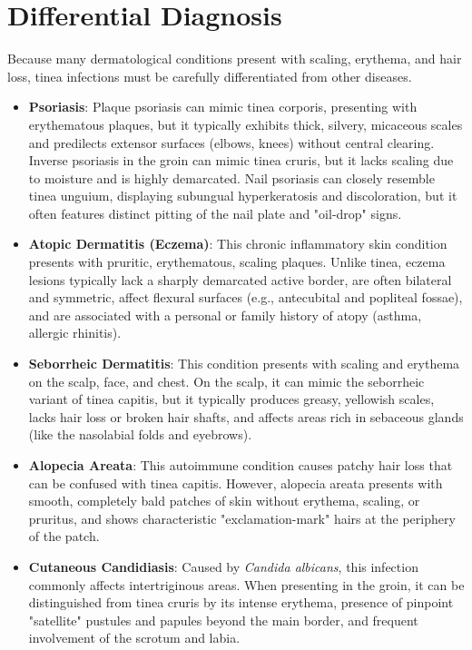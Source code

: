 \section*{Differential Diagnosis}
Because many dermatological conditions present with scaling, erythema, and hair loss, tinea infections must be carefully differentiated from other diseases.
\begin{itemize}
    \item \textbf{Psoriasis}: Plaque psoriasis can mimic tinea corporis, presenting with erythematous plaques, but it typically exhibits thick, silvery, micaceous scales and predilects extensor surfaces (elbows, knees) without central clearing. Inverse psoriasis in the groin can mimic tinea cruris, but it lacks scaling due to moisture and is highly demarcated. Nail psoriasis can closely resemble tinea unguium, displaying subungual hyperkeratosis and discoloration, but it often features distinct pitting of the nail plate and "oil-drop" signs.
    \item \textbf{Atopic Dermatitis (Eczema)}: This chronic inflammatory skin condition presents with pruritic, erythematous, scaling plaques. Unlike tinea, eczema lesions typically lack a sharply demarcated active border, are often bilateral and symmetric, affect flexural surfaces (e.g., antecubital and popliteal fossae), and are associated with a personal or family history of atopy (asthma, allergic rhinitis).
    \item \textbf{Seborrheic Dermatitis}: This condition presents with scaling and erythema on the scalp, face, and chest. On the scalp, it can mimic the seborrheic variant of tinea capitis, but it typically produces greasy, yellowish scales, lacks hair loss or broken hair shafts, and affects areas rich in sebaceous glands (like the nasolabial folds and eyebrows).
    \item \textbf{Alopecia Areata}: This autoimmune condition causes patchy hair loss that can be confused with tinea capitis. However, alopecia areata presents with smooth, completely bald patches of skin without erythema, scaling, or pruritus, and shows characteristic "exclamation-mark" hairs at the periphery of the patch.
    \item \textbf{Cutaneous Candidiasis}: Caused by \textit{Candida albicans}, this infection commonly affects intertriginous areas. When presenting in the groin, it can be distinguished from tinea cruris by its intense erythema, presence of pinpoint "satellite" pustules and papules beyond the main border, and frequent involvement of the scrotum and labia.

\end{itemize}
